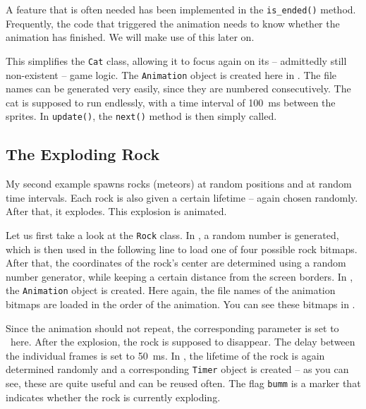 A feature that is often needed has been implemented in the \texttt{is\_ended()} method. Frequently, the code that triggered the animation needs to know whether the animation has finished. We will make use of this later on.


This simplifies the \texttt{Cat} class, allowing it to focus again on its -- admittedly still non-existent -- game logic. The \texttt{Animation} object is created here in . The file names can be generated very easily, since they are numbered consecutively. The cat is supposed to run endlessly, with a time interval of \SI{100}{ms} between the sprites. In \texttt{update()}, the \texttt{next()} method is then simply called.



\subsection{The Exploding Rock}

My second example spawns rocks (meteors) at random positions and at random time intervals. Each rock is also given a certain lifetime -- again chosen randomly. After that, it explodes. This explosion is animated.

Let us first take a look at the \texttt{Rock} class. In , a random number is generated, which is then used in the following line to load one of four possible rock bitmaps. After that, the coordinates of the rock’s center are determined using a random number generator, while keeping a certain distance from the screen borders. In , the \texttt{Animation} object is created. Here again, the file names of the animation bitmaps are loaded in the order of the animation. You can see these bitmaps in .

Since the animation should not repeat, the corresponding parameter is set to \false\ here. After the explosion, the rock is supposed to disappear. The delay between the individual frames is set to \SI{50}{ms}. In , the lifetime of the rock is again determined randomly and a corresponding \texttt{Timer} object is created -- as you can see, these are quite useful and can be reused often. The flag \texttt{bumm} is a marker that indicates whether the rock is currently exploding.

